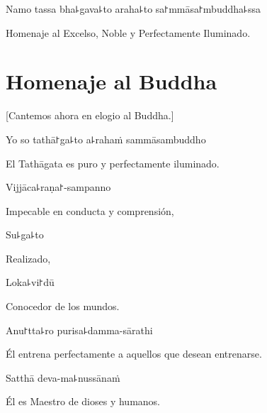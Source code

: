 \vspace{\baselineskip}

Namo tassa bha꜕gava꜕to araha꜕to sa꜓mmāsa꜓mbuddha꜕ssa


\begin{english}
  Homenaje al Excelso, Noble y Perfectamente Iluminado.

\end{english}

\clearpage

\chapter{Homenaje al Buddha}

\begin{leader}
\end{leader}

\begin{english}
  [Cantemos ahora en elogio al Buddha.]
\end{english}

Yo so tathā꜓ga꜕to a꜕rahaṁ sammāsambuddho

\begin{english}
  El Tathāgata es puro y perfectamente iluminado.
\end{english}

Vijjāca꜕raṇa꜓-sampanno

\begin{english}
  Impecable en conducta y comprensión,
\end{english}

Su꜕ga꜕to

\begin{english}
  Realizado,
\end{english}

Loka꜕vi꜓dū

\begin{english}
  Conocedor de los mundos.
\end{english}

Anu꜓tta꜕ro purisa꜕damma-sārathi

\begin{english}
  Él entrena perfectamente a aquellos que desean entrenarse.
\end{english}

Satthā deva-ma꜕nussānaṁ

\begin{english}
  Él es Maestro de dioses y humanos.
\end{english}

